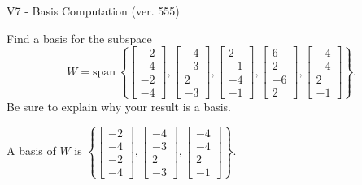 \begin{exercise}
  \begin{exerciseTitle}V7 - Basis Computation (ver. 555)\end{exerciseTitle}
  \begin{exerciseStatement}
    Find a basis for the subspace 
\[W=\mathrm{span}\ \left\{\left[\begin{array}{r}
-2 \\
-4 \\
-2 \\
-4
\end{array}\right] , \left[\begin{array}{r}
-4 \\
-3 \\
2 \\
-3
\end{array}\right] , \left[\begin{array}{r}
2 \\
-1 \\
-4 \\
-1
\end{array}\right] , \left[\begin{array}{r}
6 \\
2 \\
-6 \\
2
\end{array}\right] , \left[\begin{array}{r}
-4 \\
-4 \\
2 \\
-1
\end{array}\right]\right\}.\]
 Be sure to explain why your result is a basis.


  \end{exerciseStatement}
  \begin{exerciseAnswer}
   A basis of \(W\) is  \(\left\{\left[\begin{array}{r}
-2 \\
-4 \\
-2 \\
-4
\end{array}\right] , \left[\begin{array}{r}
-4 \\
-3 \\
2 \\
-3
\end{array}\right] , \left[\begin{array}{r}
-4 \\
-4 \\
2 \\
-1
\end{array}\right]\right\}\).
  


  \end{exerciseAnswer}
\end{exercise}